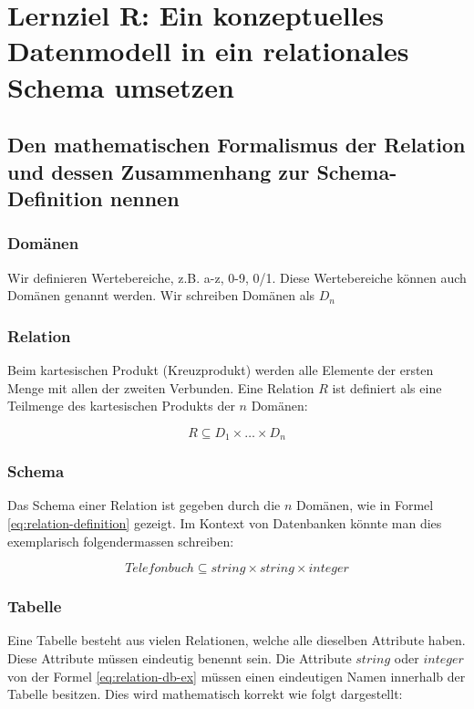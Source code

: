 \section{Lernziel R: Ein konzeptuelles Datenmodell in ein relationales Schema umsetzen}

\subsection{Den mathematischen Formalismus der Relation und dessen Zusammenhang zur Schema-Definition nennen}

\subsubsection{Domänen}
Wir definieren Wertebereiche, z.B. a-z, 0-9, 0/1. Diese Wertebereiche können auch Domänen genannt werden. Wir schreiben Domänen als $D_{n}$

\subsubsection{Relation}
Beim kartesischen Produkt (Kreuzprodukt) werden alle Elemente der ersten Menge mit allen der zweiten Verbunden. Eine Relation $R$ ist definiert als eine Teilmenge des kartesischen Produkts der $n$ Domänen:

\begin{equation}\label{eq:relation-definition}
    R \subseteq D_{1} \times \dots \times D_{n}
\end{equation}

\subsubsection{Schema}
Das Schema einer Relation ist gegeben durch die $n$ Domänen, wie in Formel \ref{eq:relation-definition} gezeigt. Im Kontext von Datenbanken könnte man dies exemplarisch folgendermassen schreiben:

\begin{equation}\label{eq:relation-db-ex}
    Telefonbuch \subseteq string \times string \times integer
\end{equation}

\subsubsection{Tabelle}
Eine Tabelle besteht aus vielen Relationen, welche alle dieselben Attribute haben. Diese Attribute müssen eindeutig benennt sein.
Die Attribute $string$ oder $integer$ von der Formel \ref{eq:relation-db-ex} müssen einen eindeutigen Namen innerhalb der Tabelle besitzen. Dies wird mathematisch korrekt wie folgt dargestellt:


